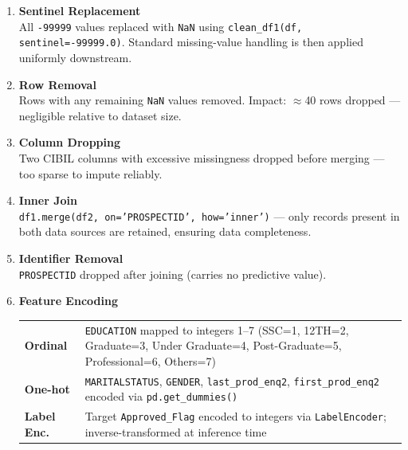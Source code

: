 \documentclass[12pt,a4paper]{article}
\renewcommand{\arraystretch}{1.45}
\begin{document}
\begin{enumerate}

  \item \textbf{Sentinel Replacement}\\
  All \texttt{-99999} values replaced with \texttt{NaN} using
  \texttt{clean\_df1(df, sentinel=-99999.0)}. Standard missing-value
  handling is then applied uniformly downstream.

  \item \textbf{Row Removal}\\
  Rows with any remaining \texttt{NaN} values removed. Impact: $\approx$40
  rows dropped --- negligible relative to dataset size.

  \item \textbf{Column Dropping}\\
  Two CIBIL columns with excessive missingness dropped before merging --- too
  sparse to impute reliably.

  \item \textbf{Inner Join}\\
  \texttt{df1.merge(df2, on='PROSPECTID', how='inner')} --- only records present
  in both data sources are retained, ensuring data completeness.

  \item \textbf{Identifier Removal}\\
  \texttt{PROSPECTID} dropped after joining (carries no predictive value).

  \item \textbf{Feature Encoding}

  \begin{tcolorbox}[
    colback=lightbg, colframe=secondary, arc=4pt,
    left=6pt, right=6pt, top=4pt, bottom=4pt,
  ]
  \renewcommand{\arraystretch}{1.4}
  \begin{tabular}{@{} p{2.8cm} p{10.5cm} @{}}
    \textbf{Ordinal}
      & \texttt{EDUCATION} mapped to integers 1--7
        (SSC=1, 12TH=2, Graduate=3, Under Graduate=4,
         Post-Graduate=5, Professional=6, Others=7) \\
    \textbf{One-hot}
      & \texttt{MARITALSTATUS}, \texttt{GENDER},
        \texttt{last\_prod\_enq2}, \texttt{first\_prod\_enq2}
        encoded via \texttt{pd.get\_dummies()} \\
    \textbf{Label Enc.}
      & Target \texttt{Approved\_Flag} encoded to integers via
        \texttt{LabelEncoder}; inverse-transformed at inference time \\
  \end{tabular}
  \end{tcolorbox}


\end{enumerate}
\end{document}
